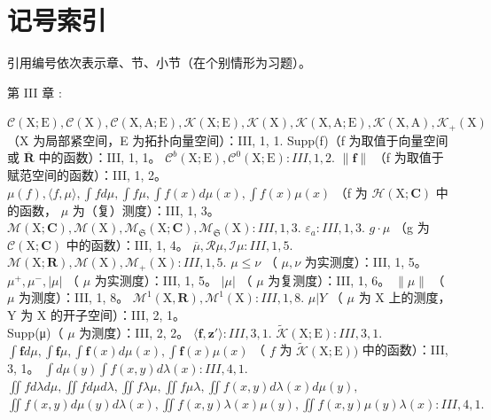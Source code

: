 \chapter*{记号索引}
{}

引用编号依次表示章、节、小节（在个别情形为习题）。

第 III 章 :

\(\mathcal{C}(\mathrm{X};\mathrm{E}),\mathcal{C}(\mathrm{X}),\mathcal{C}(\mathrm{X},\mathrm{A};\mathrm{E}),\mathcal{K}(\mathrm{X};\mathrm{E}),\mathcal{K}(\mathrm{X}),\mathcal{K}(\mathrm{X},\mathrm{A};\mathrm{E}),\mathcal{K}(\mathrm{X},\mathrm{A}),\mathcal{K}_{+}(\mathrm{X})\) （X 为局部紧空间，E 为拓扑向量空间）：III, 1, 1. Supp(f)（f 为取值于向量空间或 \(\overline{\mathbf{R}}\) 中的函数）：III, 1, 1。 \(\mathcal{C}^b (\mathrm{X};\mathrm{E}),\mathcal{C}^0 (\mathrm{X};\mathrm{E}):III,1,2.\) \(\| \mathbf{f}\|\) （f 为取值于赋范空间的函数）：III, 1, 2。 \(\mu (f),\langle f,\mu \rangle ,\int fd\mu ,\int f\mu ,\int f(x)d\mu (x),\int f(x)\mu (x)\) （f 为 \(\mathcal{H}(\mathrm{X};\mathbf{C})\) 中的函数， \(\mu\) 为（复）测度）：III, 1, 3。 \(\mathcal{M}(\mathrm{X};\mathbf{C}),\mathcal{M}(\mathrm{X}),\mathcal{M}_{\mathfrak{S}}(\mathrm{X};\mathbf{C}),\mathcal{M}_{\mathfrak{S}}(\mathrm{X}):III,1,3.\) \(\varepsilon_{a}:III,1,3.\) \(g\cdot \mu\) （g 为 \(\mathcal{C}(\mathrm{X};\mathbf{C})\) 中的函数）：III, 1, 4。 \(\overline{\mu},\mathcal{R}\mu ,\mathcal{I}\mu :III,1,5.\) \(\mathcal{M}(\mathrm{X};\mathbf{R}),\mathcal{M}(\mathrm{X}),\mathcal{M}_{+}(\mathrm{X}):III,1,5.\) \(\mu \leqslant \nu\) （ \(\mu ,\nu\) 为实测度）：III, 1, 5。 \(\mu^{+},\mu^{-},|\mu |\) （ \(\mu\) 为实测度）：III, 1, 5。 \(|\mu |\) （ \(\mu\) 为复测度）：III, 1, 6。 \(\| \mu \|\) （ \(\mu\) 为测度）：III, 1, 8。 \(\mathcal{M}^1 (\mathrm{X},\mathbf{R}),\mathcal{M}^1 (\mathrm{X}):III,1,8.\) \(\mu |Y\) （ \(\mu\) 为 X 上的测度，Y 为 X 的开子空间）：III, 2, 1。\\
Supp(μ)（ \(\mu\) 为测度）：III, 2, 2。 \(\langle \mathbf{f},\mathbf{z}'\rangle :III,3,1.\) \(\widetilde{\mathcal{K}} (\mathrm{X};\mathrm{E}):III,3,1.\) \(\int \mathbf{f}d\mu ,\int \mathbf{f}\mu ,\int \mathbf{f}(x)d\mu (x),\int \mathbf{f}(x)\mu (x)\) （ \(f\) 为 \(\widetilde{\mathcal{K}} (\mathrm{X};\mathrm{E}))\) 中的函数）：III, 3, 1。 \(\int d\mu (y)\int f(x,y)d\lambda (x):III,4,1.\) \(\iint f d\lambda d\mu ,\iint f d\mu d\lambda ,\iint f\lambda \mu ,\iint f\mu \lambda ,\iint f(x,y)d\lambda (x)d\mu (y),\) \(\iint f(x,y)d\mu (y)d\lambda (x),\iint f(x,y)\lambda (x)\mu (y),\iint f(x,y)\mu (y)\lambda (x):III,4,1.\)

